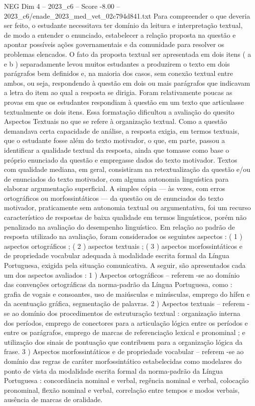 \begin{textsample}{NEG Dim 4 – 2023\_c6 – Score -8.00 – 2023\_c6/enade\_2023\_med\_vet\_02c794d841.txt}
Para compreender o que deveria ser feito, o estudante necessitava ter domínio da leitura e interpretação textual, de modo a entender o enunciado, estabelecer a relação proposta na questão e apontar possíveis ações governamentais e da comunidade para resolver os problemas elencados.
O fato da proposta textual ser apresentada em dois itens ( a e b ) separadamente levou muitos estudantes a produzirem o texto em dois parágrafos bem definidos e, na maioria dos casos, sem conexão textual entre ambos, ou seja, respondendo à questão em dois ou mais parágrafos que indicavam a letra do item ao qual a resposta se dirigia.
Foram relativamente poucas as provas em que os estudantes respondiam à questão em um texto que articulasse textualmente os dois itens.
Essa formatação dificultou a avaliação do quesito Aspectos Textuais no que se refere à organização textual.
Como a questão demandava certa capacidade de análise, a resposta exigia, em termos textuais, que o estudante fosse além do texto motivador, o que, em parte, passou a identificar a qualidade textual da resposta, ainda que tomasse como base o próprio enunciado da questão e empregasse dados do texto motivador.
Textos com qualidade mediana, em geral, consistiram na retextualização da questão e/ou de enunciados do texto motivador, com alguma autonomia linguística para elaborar argumentação superficial.
A simples cópia — às vezes, com erros ortográficos ou morfossintáticos — da questão ou de enunciados do texto motivador, praticamente sem autonomia textual ou argumentativa, foi um recurso característico de respostas de baixa qualidade em termos linguísticos, porém não penalizado na avaliação do desempenho linguístico.
Em relação ao padrão de resposta utilizado na avaliação, foram considerados os seguintes aspectos : ( 1 ) aspectos ortográficos ; ( 2 ) aspectos textuais ; ( 3 ) aspectos morfossintáticos e de propriedade vocabular adequada à modalidade escrita formal da Língua Portuguesa, exigida pela situação comunicativa.
A seguir, são apresentados cada um dos aspectos avaliados : 1 ) Aspectos ortográficos – referem -se ao domínio das convenções ortográficas da norma-padrão da Língua Portuguesa, como : grafia de vogais e consoantes, uso de maiúsculas e minúsculas, emprego do hífen e da acentuação gráfica, segmentação de palavras. 2 ) Aspectos textuais – referem -se ao domínio dos procedimentos de estruturação textual : organização interna dos períodos, emprego de conectores para a articulação lógica entre os períodos e entre os parágrafos, emprego de marcas de referenciação lexical e pronominal ; e utilização dos sinais de pontuação que contribuem para a organização lógica da frase. 3 ) Aspectos morfossintáticos e de propriedade vocabular – referem -se ao domínio das regras de caráter morfossintático estabelecidas como modelares do ponto de vista da modalidade escrita formal da norma-padrão da Língua Portuguesa : concordância nominal e verbal, regência nominal e verbal, colocação pronominal, flexão nominal e verbal, correlação entre tempos e modos verbais, ausência de marcas de oralidade.

\end{textsample}
